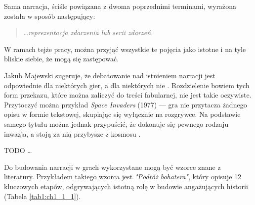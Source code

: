 Sama narracja, ściśle powiązana z dwoma poprzednimi terminami, wyrażona została w sposób
następujący:

\begin{quotation}
	\ldots \textit{reprezentacja zdarzenia lub serii zdarzeń.} \cite{narrative_structures}
\end{quotation}

W ramach tejże pracy, można przyjąć wszystkie te pojęcia jako istotne i na tyle bliskie
siebie, że mogą się zastępować.

Jakub Majewski sugeruje, że debatowanie nad istnieniem narracji jest odpowiednie dla niektórych
gier, a dla niektórych nie \cite{theorising_narrative}. Rozdzielenie bowiem tych form
przekazu, które można zaliczyć do treści fabularnej, nie jest takie oczywiste. Przytoczyć można
przykład \textit{Space Invaders} (1977) --- gra nie przytacza żadnego opisu w formie tekstowej,
skupiając się wyłącznie na rozgrywce. Na podstawie samego tytułu można jednak
przypuścić, że dokonuje się pewnego rodzaju inwazja, a stoją za nią przybysze z kosmosu \cite{theorising_narrative}.

TODO \ldots

Do budowania narracji w grach wykorzystane mogą być wzorce znane z literatury. Przykładem takiego wzorca jest
\textit{"Podróż bohatera"}\cite{narrative_structures}, który opisuje 12 kluczowych etapów, odgrywających
istotną rolę w budowie angażujących historii (Tabela \ref{tab1:ch1_1_1}).

